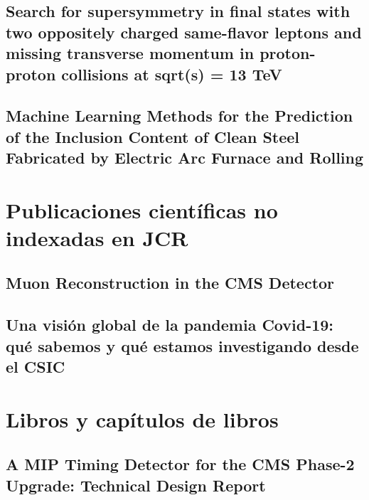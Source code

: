 \documentclass[a4paper, 11pt, twoside, openright]{report}
\begin{document}
\subsection{Search for supersymmetry in final states with two oppositely charged same-flavor leptons and missing transverse momentum in proton-proton collisions at sqrt(s) = 13 TeV}


\subsection{Machine Learning Methods for the Prediction of the Inclusion Content of Clean Steel Fabricated by Electric Arc Furnace and Rolling}



\section{Publicaciones científicas no indexadas en JCR}

\subsection{Muon Reconstruction in the CMS Detector}


\subsection{Una visión global de la pandemia Covid-19: qué sabemos y qué estamos investigando desde el CSIC}


\section{Libros y capítulos de libros}

\subsection{A MIP Timing Detector for the CMS Phase-2 Upgrade: Technical Design Report}

\end{document}
